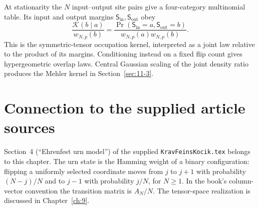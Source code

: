 At stationarity the $N$ input--output site pairs give a four-category
multinomial table. Its input and output margins $\mathsf S_{\mathrm{in}},\mathsf S_{\mathrm{out}}$ obey
\[
\frac{\mathcal K(b\mid a)}{w_{N,p}(b)}
=\frac{\Pr(\mathsf S_{\mathrm{in}}=a,\mathsf S_{\mathrm{out}}=b)}{w_{N,p}(a)w_{N,p}(b)}.
\]
This is the symmetric-tensor occupation kernel, interpreted as a joint
law relative to the product of its margins. Conditioning instead on a
fixed flip count gives hypergeometric overlap laws. Central Gaussian
scaling of the joint density ratio produces the Mehler kernel in
Section~\ref{sec:11-3}.

\section*{Connection to the supplied article sources}
Section~4 (``Ehrenfest urn model'') of the supplied
\texttt{KravFeinsKocik.tex} belongs to this chapter.
The urn state is the Hamming weight of a binary configuration: flipping
a uniformly selected coordinate moves from $j$ to $j+1$ with probability
$(N-j)/N$ and to $j-1$ with probability $j/N$, for $N\geq1$.
In the book's column-vector convention the transition matrix is
$A_N/N$. The tensor-space realization is discussed in Chapter~\ref{ch:9}.
